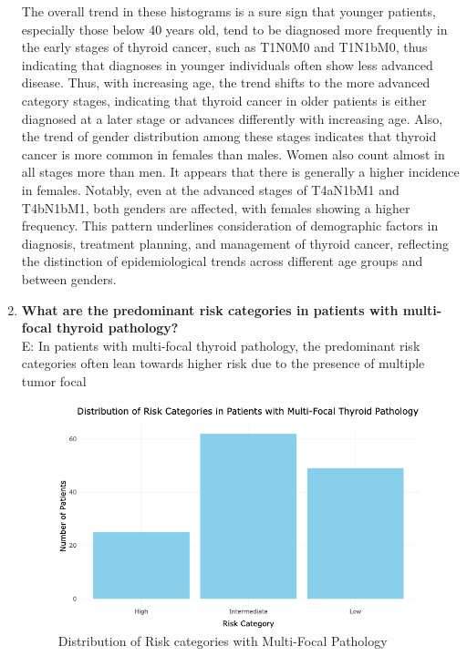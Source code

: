 \documentclass[12pt]{article}
\begin{document}
\begin{enumerate}
The overall trend in these histograms is a sure sign that younger patients, especially those below 40 years old, tend to be diagnosed more frequently in the early stages of thyroid cancer, such as T1N0M0 and T1N1bM0, thus indicating that diagnoses in younger individuals often show less advanced disease. Thus, with increasing age, the trend shifts to the more advanced category stages, indicating that thyroid cancer in older patients is either diagnosed at a later stage or advances differently with increasing age. Also, the trend of gender distribution among these stages indicates that thyroid cancer is more common in females than males. Women also count almost in all stages more than men. It appears that there is generally a higher incidence in females. Notably, even at the advanced stages of T4aN1bM1 and T4bN1bM1, both genders are affected, with females showing a higher frequency. This pattern underlines consideration of demographic factors in diagnosis, treatment planning, and management of thyroid cancer, reflecting the distinction of epidemiological trends across different age groups and between genders.


 \item \textbf{What are the predominant risk categories in patients with multi-focal thyroid pathology?} \\
    E: In patients with multi-focal thyroid pathology, the predominant risk categories often lean towards higher risk due to the presence of multiple tumor focal
    \begin{figure}[h]
        \vspace{5pt}
        \centering
        \includegraphics[width=1.1\textwidth]{risk vs multi.png}  
        \caption{Distribution of Risk categories with Multi-Focal Pathology}
            \label{fig:example}
       \vspace{0.5cm}
    \end{figure}


\end{enumerate}
\end{document}

